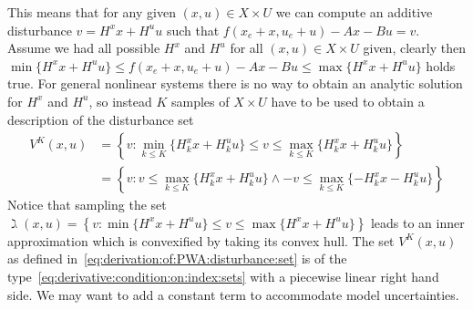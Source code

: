 %
This means that for any given $(x,u)\in X\times U$ we can compute an additive disturbance $v=H^x x + H^u u$
such that $f(x_e+x,u_e+u)-Ax-Bu = v$.
%
Assume we had all possible $H^x$ and $H^u$ for all $(x,u)\in X\times U$ given, clearly then 
$\min\{H^x x + H^u u\} \leq f(x_e+x,u_e+u)-Ax-Bu \leq \max\{H^x x + H^u u\}$ holds true.
%
For general nonlinear systems there is no way to obtain an analytic solution for $H^x$ and $H^u$,
so instead $K$ samples of $X\times U$ have to be used to obtain a description of 
the disturbance set
%
\begin{equation}\label{eq:derivation:of:PWA:disturbance:set}
\begin{split}
	V^K(x,u) &= \left\{v: \min_{k\leq K}\{H^x_k x + H^u_k u\} \leq v \leq \max_{k\leq K}\{H^x_k x + H^u_k u\} \right\}\\
	&= \left\{v: v \leq \max_{k\leq K}\{H^x_k x + H^u_k u\} \wedge -v \leq \max_{k\leq K}\{-H^x_k x - H^u_k u\} \right\}
\end{split}
\end{equation}
%
Notice that sampling the set $\gimel(x,u) = \left\{v : \min\{H^x x + H^u u\} \leq v \leq \max\{H^x x + H^u u\}\right\}$ 
leads to an inner approximation which is convexified by taking its convex hull.
%
The set $V^K(x,u)$ as defined in~\eqref{eq:derivation:of:PWA:disturbance:set} is of the
type~\eqref{eq:derivative:condition:on:index:sets} with a piecewise linear right hand side. We may
want to add a constant term to accommodate model uncertainties.
%
%
%
%
